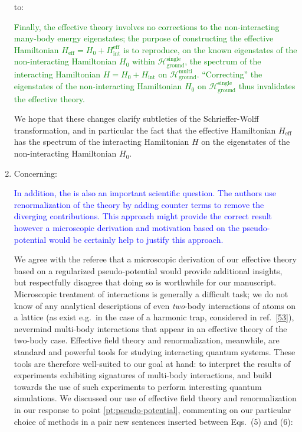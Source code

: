 \documentclass[preprint]{revtex4-1}
\renewcommand{\t}{\text} %
\renewcommand{\H}{\mathcal{H}}
\newcommand{\1}{\mathds{1}}
\newcommand{\blue}[1]{\textcolor{blue}{#1}}
\newcommand{\green}[1]{\textcolor{green}{#1}}
\begin{document}
\begin{enumerate}
  to:

  \green{Finally, the effective theory involves no corrections to the
    non-interacting many-body energy eigenstates; the purpose of
    constructing the effective Hamiltonian
    $H_{\t{eff}} = H_0 + H_{\t{int}}^{\t{eff}}$ is to reproduce, on
    the known eigenstates of the non-interacting Hamiltonian $H_0$
    within $\H_{\t{ground}}^{\t{single}}$, the spectrum of the
    interacting Hamiltonian $H = H_0 + H_{\t{int}}$ on
    $\H_{\t{ground}}^{\t{multi}}$.  ``Correcting'' the eigenstates of
    the non-interacting Hamiltonian $H_0$ on
    $\H_{\t{ground}}^{\t{single}}$ thus invalidates the effective
    theory.}

  We hope that these changes clarify subtleties of the
  Schrieffer-Wolff transformation, and in particular the fact that the
  effective Hamiltonian $H_{\t{eff}}$ has the spectrum of the
  interacting Hamiltonian $H$ on the eigenstates of the
  non-interacting Hamiltonian $H_0$.


\item Concerning:

  \blue{In addition, the is also an important scientific question. The
    authors use renormalization of the theory by adding counter terms
    to remove the diverging contributions. This approach might provide
    the correct result however a microscopic derivation and motivation
    based on the pseudo-potential would be certainly help to justify
    this approach.}

  We agree with the referee that a microscopic derivation of our
  effective theory based on a regularized pseudo-potential would
  provide additional insights, but respectfully disagree that doing so
  is worthwhile for our manuscript.  Microscopic treatment of
  interactions is generally a difficult task; we do not know of any
  analytical descriptions of even {\it two}-body interactions of atoms
  on a lattice (as exist e.g.~in the case of a harmonic trap,
  considered in
  ref.~[\href{https://link.springer.com/article/10.1023\%2FA\%3A1018705520999}{53}]),
  nevermind multi-body interactions that appear in an effective theory
  of the two-body case.  Effective field theory and renormalization,
  meanwhile, are standard and powerful tools for studying interacting
  quantum systems.  These tools are therefore well-suited to our goal
  at hand: to interpret the results of experiments exhibiting
  signatures of multi-body interactions, and build towards the use of
  such experiments to perform interesting quantum simulations.  We
  discussed our use of effective field theory and renormalization in
  our response to point \ref{pt:pseudo-potential}, commenting on our
  particular choice of methods in a pair new sentences inserted
  between Eqs.~(5) and (6):


\end{enumerate}
\end{document}
